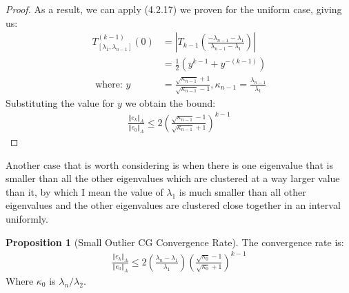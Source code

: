\documentclass[]{article}
\theoremstyle{definition}
\newtheorem{prop}{Proposition}[section]  %
\begin{document}
\begin{proof}
                As a result, we can apply (4.2.17) we proven for the uniform case, giving us: 
                \begin{align}
                    T^{(k - 1)}_{[\lambda_1, \lambda_{n - 1}]}
                    \left(
                        0
                    \right)
                    &= \left|
                        T_{k-1}\left(
                            \frac{
                                -\lambda_{n-1} - \lambda_1
                            }
                            {\lambda_{n-1}- \lambda_1}
                        \right)
                    \right|
                    \\ 
                    &=
                    \frac{1}{2}(y^{k - 1} + y^{-(k - 1)})
                    \\
                    \text{ where: } y &= \frac{\sqrt{\kappa_{n - 1}} + 1}{\sqrt{\kappa_{n - 1}} - 1}, \kappa_{n - 1} = \frac{\lambda_{n - 1}}{\lambda_1}
                \end{align}
                Substituting the value for $y$ we obtain the bound: 
                \begin{align}
                    \frac{\Vert e_k\Vert_A}{\Vert e_0\Vert_A} \le 
                    2\left(
                        \frac{\sqrt{\kappa_{n - 1}} - 1}{\sqrt{\kappa_{n - 1}} + 1}
                    \right)^{k - 1}
                \end{align}
            \end{proof}
            Another case that is worth considering is when there is one eigenvalue that is smaller than all the other eigenvalues which are clustered at a way larger value than it, by which I mean the value of $\lambda_1$ is much smaller than all other eigenvalues and the other eigenvalues are clustered close together in an interval uniformly. 
            \begin{prop}[Small Outlier CG Convergence Rate]
                The convergence rate is: 
                \begin{align}
                    \frac{\Vert e_k\Vert_A}{\Vert e_0\Vert_A} \le 
                    2\left(
                        \frac{\lambda_n - \lambda_1}{\lambda_1}
                    \right)
                    \left(
                        \frac{\sqrt{\kappa_0} - 1}{\sqrt{\kappa_0} + 1}
                    \right)^{k - 1}
                \end{align}
                Where $\kappa_0$ is $\lambda_n/\lambda_2$. 
            \end{prop}
\end{document}
